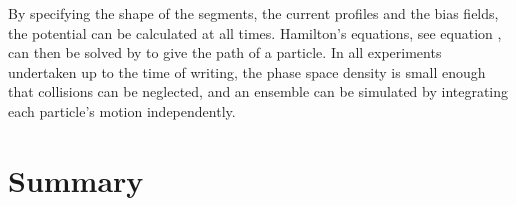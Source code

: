 By specifying the shape of the segments, the current profiles and the bias
fields, the potential can be calculated at all times. Hamilton's equations, see
equation , can then be solved by  to give the path of a
particle. In all \CaF experiments undertaken up to the time of writing, the
phase space density is small enough that collisions can be neglected, and an
ensemble can be simulated by integrating each particle's motion independently.


\section{Summary}

